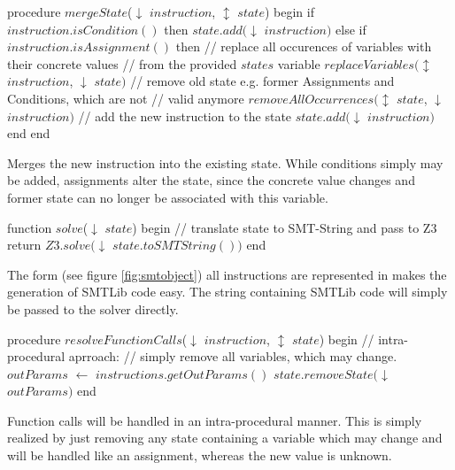 \begin{program}[h!]
	\begin{GenericCode}
	procedure $mergeState$($\downarrow$ $instruction$, $\updownarrow$ $state$) begin
		if $instruction.isCondition()$ then
			$state.add($$\downarrow$ $instruction$$)$
		else if $instruction.isAssignment()$ then
			// replace all occurences of variables with their concrete values
			// from the provided $states$ variable
			$replaceVariables($$\updownarrow$ $instruction$, $\downarrow$ $state$$)$ 
			// remove old state e.g. former Assignments and Conditions, which are not
			// valid anymore
			$removeAllOccurrences($$\updownarrow$ $state$, $\downarrow$ $instruction$$)$
			// add the new instruction to the state
			$state.add($$\downarrow$ $instruction$$)$
		end 
	end		
	\end{GenericCode}
	\caption{Merges the new instruction into the existing state. While conditions simply may be added, assignments alter the state, since the concrete value changes and former state can no longer be associated with this variable. }
\label{code:merge state}
\end{program}
\begin{program}[h!]
	\begin{GenericCode}
	function $solve$($\downarrow$ $state$) begin
		// translate state to SMT-String and pass to Z3
		return $Z3.solve($$\downarrow$ $state.toSMTString())$
	end
	\end{GenericCode}
	\caption{The form (see figure \ref{fig:smtobject}) all instructions are represented in makes the generation of SMTLib code easy. The string containing SMTLib code will simply be passed to the solver directly.}
\label{code:z3 solver}
\end{program}
\begin{program}[h!]
	\begin{GenericCode}
	procedure $resolveFunctionCalls$($\downarrow$ $instruction$, $\updownarrow$ $state$) begin
		// intra-procedural aprroach:
		// simply remove all variables, which may change.
		$outParams$ $\leftarrow$ $instructions.getOutParams()$
		$state.removeState($$\downarrow$ $outParams$$)$
	end		
	\end{GenericCode}
	\caption{Function calls will be handled in an intra-procedural manner. This is simply realized by just removing any state containing a variable which may change and will be handled like an assignment, whereas the new value is unknown. }
	\label{code:intraprocedural analysis}
\end{program}
